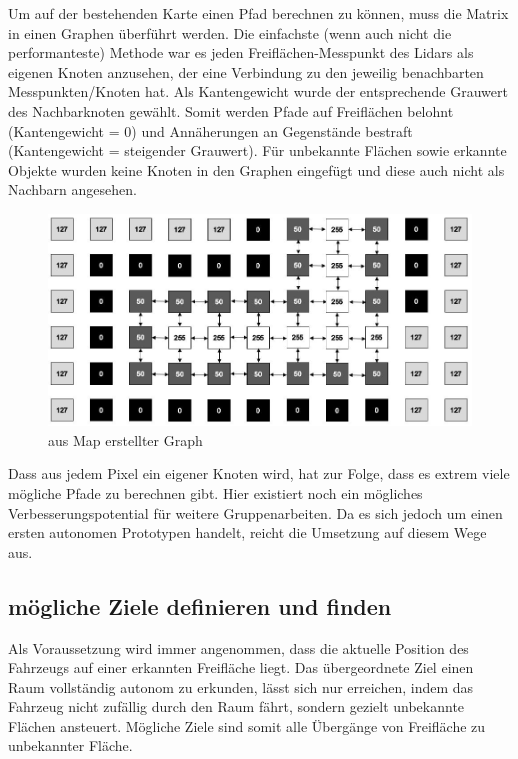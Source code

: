 Um auf der bestehenden Karte einen Pfad berechnen zu können, muss die Matrix in einen Graphen überführt werden. Die einfachste (wenn auch nicht die performanteste) Methode war es jeden Freiflächen-Messpunkt des Lidars als eigenen Knoten anzusehen, der eine Verbindung zu den jeweilig benachbarten Messpunkten/Knoten hat. Als Kantengewicht wurde der entsprechende Grauwert des Nachbarknoten gewählt. Somit werden Pfade auf Freiflächen belohnt (Kantengewicht = 0) und Annäherungen an Gegenstände bestraft (Kantengewicht = steigender Grauwert). 
Für unbekannte Flächen sowie erkannte Objekte wurden keine Knoten in den Graphen eingefügt und diese auch nicht als Nachbarn angesehen. 


\begin{figure}[h]
\begin{center}
\includegraphics[width=15cm]{images/chapter6/GraphKnoten.JPG}
\caption{aus Map erstellter Graph}
\label{Map_aus_Graph}
\end{center}
\end{figure}


Dass aus jedem Pixel ein eigener Knoten wird, hat zur Folge, dass es extrem viele mögliche Pfade zu berechnen gibt. Hier existiert noch ein mögliches Verbesserungspotential für weitere Gruppenarbeiten. Da es sich jedoch um einen ersten autonomen Prototypen handelt, reicht die Umsetzung auf diesem Wege aus.




\subsection{mögliche Ziele definieren und finden}
\label{sec:ziele}

Als Voraussetzung wird immer angenommen, dass die aktuelle Position des Fahrzeugs auf einer erkannten Freifläche liegt. Das übergeordnete Ziel einen Raum vollständig autonom zu erkunden, lässt sich nur erreichen, indem das Fahrzeug nicht zufällig durch den Raum fährt, sondern gezielt unbekannte Flächen ansteuert. Mögliche Ziele sind somit alle Übergänge von Freifläche zu unbekannter Fläche. 

